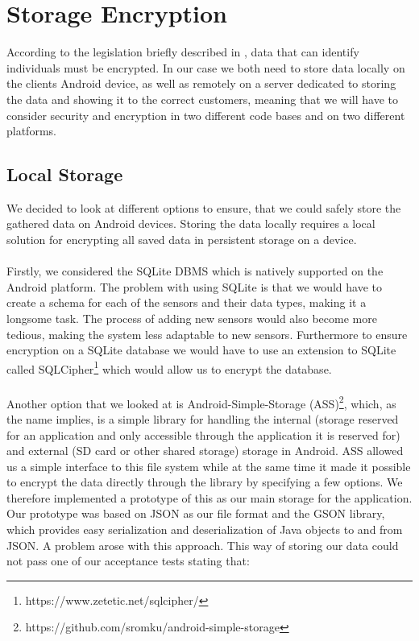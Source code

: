 
\section{Storage Encryption}
\label{sec:storage_encryption}
According to the legislation briefly described in , data that can identify individuals must be encrypted. In our case we both need to store data locally on the clients Android device, as well as remotely on a server dedicated to storing the data and showing it to the correct customers, meaning that we will have to consider security and encryption in two different code bases and on two different platforms. 

\subsection{Local Storage}
\label{sub:local_storage}
We decided to look at different options to ensure, that we could safely store the gathered data on Android devices. Storing the data locally requires a local solution for encrypting all saved data in persistent storage on a device. 
\\\\
Firstly, we considered the SQLite DBMS which is natively supported on the Android platform. The problem with using SQLite is that we would have to create a schema for each of the sensors and their data types, making it a longsome task. The process of adding new sensors would also become more tedious, making the system less adaptable to new sensors. Furthermore to ensure encryption on a SQLite database we would have to use an extension to SQLite called SQLCipher\footnote{https://www.zetetic.net/sqlcipher/} which would allow us to encrypt the database. 
\\\\
Another option that we looked at is Android-Simple-Storage (ASS)\footnote{https://github.com/sromku/android-simple-storage}, which, as the name implies, is a simple library for handling the internal (storage reserved for an application and only accessible through the application it is reserved for) and external (SD card or other shared storage) storage in Android. ASS allowed us a simple interface to this file system while at the same time it made it possible to encrypt the data directly through the library by specifying a few options. We therefore implemented a prototype of this as our main storage for the application. Our prototype was based on JSON as our file format and the GSON library, which provides easy serialization and deserialization of Java objects to and from JSON. A problem arose with this approach. This way of storing our data could not pass one of our acceptance tests stating that:

